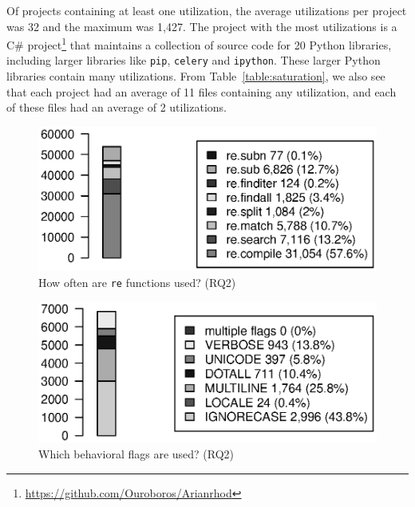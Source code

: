 Of projects containing at least one utilization, the average utilizations per project was 32 and the maximum  was 1,427.  The project with the most utilizations is a C\# project\footnote{\url{https://github.com/Ouroboros/Arianrhod}} that maintains a collection of source code for 20 Python libraries, including larger libraries like {\tt pip}, {\tt celery} and {\tt ipython}.  These larger Python libraries contain many utilizations.
From Table~\ref{table:saturation}, we also see that each project had an average of 11 files containing any utilization, and each of these files had an average of 2 utilizations.



\begin{figure}[tb]
\centering
\includegraphics[width=\columnwidth]{../analysis_output/partFunctions.eps}
\vspace{-6pt}
\caption{How often are  {\tt re} functions used? (RQ2)}
\vspace{-6pt}
\label{fig:partFunctions}
\end{figure}

\begin{figure}[tb]
\centering
\includegraphics[width=0.9\columnwidth]{../analysis_output/partFlags.eps}
\vspace{-6pt}
\caption{Which behavioral flags are used? (RQ2)}
\label{fig:partFlags}
\end{figure}


